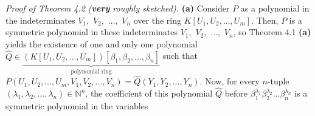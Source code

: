 \documentclass[12pt,final,notitlepage,onecolumn,german]{article}%
\begin{document}
\textit{Proof of Theorem 4.2 (\textbf{very} roughly sketched).} \textbf{(a)}
Consider $P$ as a polynomial in the indeterminates $V_{1},$ $V_{2},$ $...,$
$V_{n}$ over the ring $K\left[  U_{1},U_{2},...,U_{m}\right]  $. Then, $P$ is
a symmetric polynomial in these indeterminates $V_{1},$ $V_{2},$ $...,$
$V_{n}$, so Theorem 4.1 \textbf{(a)} yields the existence of one and only one
polynomial $\widehat{Q}\in\underbrace{\left(  K\left[  U_{1},U_{2}%
,...,U_{m}\right]  \right)  \left[  \beta_{1},\beta_{2},...,\beta_{n}\right]
}_{\text{polynomial ring}}$ such that $P\left(  U_{1},U_{2},...,U_{m}%
,V_{1},V_{2},...,V_{n}\right)  =\widehat{Q}\left(  Y_{1},Y_{2},...,Y_{n}%
\right)  $. Now, for every $n$-tuple $\left(  \lambda_{1},\lambda
_{2},...,\lambda_{n}\right)  \in\mathbb{N}^{n}$, the coefficient of this
polynomial $\widehat{Q}$ before $\beta_{1}^{\lambda_{1}}\beta_{2}^{\lambda
_{2}}...\beta_{n}^{\lambda_{n}}$ is a symmetric polynomial in the variables
\end{document}
